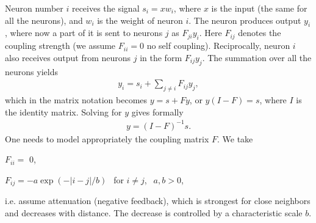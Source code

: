 \documentclass[a4paper,12pt,polish]{jupyterBook}
\begin{document}
\sphinxAtStartPar
Neuron number \(i\) receives the signal \(s_i = x w_i\), where \(x\) is the input (the same for all the neurons), and \(w_i\) is the weight of neuron \(i\). The neuron produces output \(y_i\), where now a part of it is sent to neurons \(j\) as \(F_{ji} y_i\). Here \(F_{ij}\) denotes the coupling strength (we assume \(F_{ii}=0\) \sphinxhyphen{} no self coupling). Reciprocally, neuron \(i\) also receives output from neurons \(j\) in the form \(F_{ij} y_j\). The summation over all the neurons yields
\begin{equation*}
\begin{split} 
y_i = s_i + \sum_{j\neq i} F_{ij} y_j, 
\end{split}
\end{equation*}
\sphinxAtStartPar
which in the matrix notation becomes \( y = s + F y\), or \(y(I-F)=s\), where \(I\) is the identity matrix. Solving for \(y\) gives formally
\begin{equation}\label{equation:docs/som:eq-lat}
\begin{split}y= (I-F)^{-1} s.\end{split}
\end{equation}
\sphinxAtStartPar
One needs to model appropriately the coupling matrix \(F\). We take

\sphinxAtStartPar
\( F_ {ii} = \) 0,

\sphinxAtStartPar
\( F_ {ij} = - a \exp (- | i-j | / b) ~~ \) for \( i \neq j \), \( ~~ a, b> 0 \),

\sphinxAtStartPar
i.e. assume attenuation (negative feedback), which is strongest for close neighbors and decreases with distance. The decrease is controlled by a characteristic scale \(b\).
\end{document}
